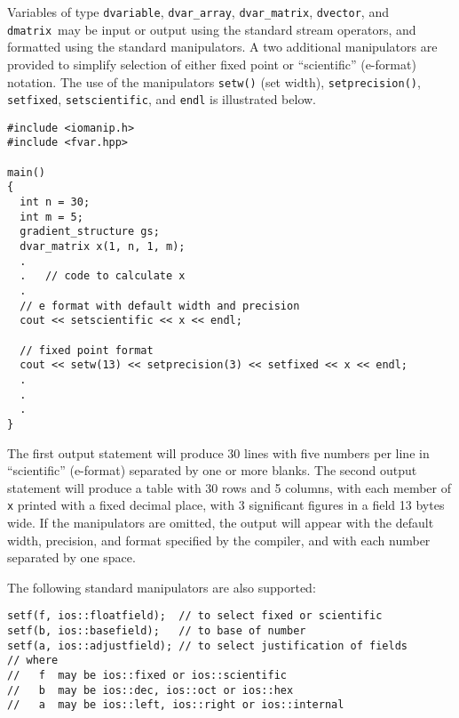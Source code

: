 \documentclass{admbmanual}
\newcommand\adtypes{\texttt{dvariable}, \texttt{dvar\_array}, \texttt{dvar\_matrix}, \texttt{dvector}, and \texttt{dmatrix}}
\begin{document}
Variables of type \adtypes\ may be input or output using the
standard stream operators, and formatted using the standard
manipulators. A two additional manipulators are provided to
simplify selection of either fixed point or ``scientific''
(e-format) notation.
The use of the manipulators \texttt{setw()} (set width),
\texttt{setprecision()}, \texttt{setfixed}, \texttt{setscientific},
and \texttt{endl} is illustrated below.
\begin{lstlisting}
#include <iomanip.h>
#include <fvar.hpp>

main()
{
  int n = 30;
  int m = 5;
  gradient_structure gs;
  dvar_matrix x(1, n, 1, m);
  .
  .   // code to calculate x
  . 
  // e format with default width and precision
  cout << setscientific << x << endl;

  // fixed point format
  cout << setw(13) << setprecision(3) << setfixed << x << endl;
  .
  .
  .  
}
\end{lstlisting} 
The first output statement will produce 30 lines with five numbers
per line in ``scientific'' (e-format) separated by one or more blanks.
The second output statement will produce a table with 30 rows and 5 columns,
with each member of \texttt{x} printed with a fixed decimal place,
with 3 significant figures in a field 13 bytes wide.
If the manipulators are omitted, the output will appear with the
default width, precision, and format specified by the compiler, and with each
number separated by one space.

The following standard manipulators are also supported:
\begin{lstlisting}
setf(f, ios::floatfield);  // to select fixed or scientific
setf(b, ios::basefield);   // to base of number
setf(a, ios::adjustfield); // to select justification of fields
// where
//   f  may be ios::fixed or ios::scientific
//   b  may be ios::dec, ios::oct or ios::hex
//   a  may be ios::left, ios::right or ios::internal
\end{lstlisting}

 
\end{document}
